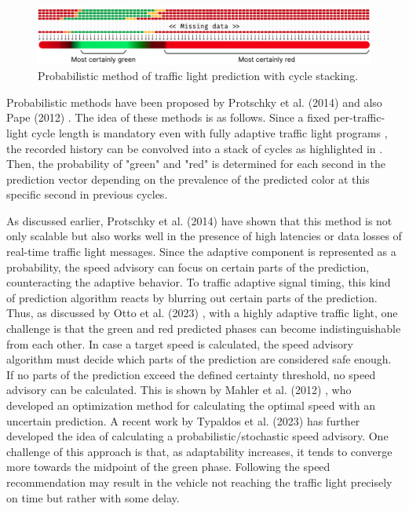 \begin{figure}[t]
\centering
\includegraphics[width=\linewidth]{images/prediction.pdf}
\caption{Probabilistic method of traffic light prediction with cycle stacking.}
\label{fig:prediction}
\end{figure}

Probabilistic methods have been proposed by Protschky et al. (2014) \cite{protschky_extensive_2014, protschky_adaptive_2014} and also Pape (2012) \cite{pape_untersuchung_2012}. The idea of these methods is as follows. Since a fixed per-traffic-light cycle length is mandatory even with fully adaptive traffic light programs \cite{protschky_extensive_2014}, the recorded history can be convolved into a stack of cycles as highlighted in . Then, the probability of "green" and "red" is determined for each second in the prediction vector depending on the prevalence of the predicted color at this specific second in previous cycles.

As discussed earlier, Protschky et al. (2014) \cite{protschky_extensive_2014, protschky_adaptive_2014} have shown that this method is not only scalable but also works well in the presence of high latencies or data losses of real-time traffic light messages. Since the adaptive component is represented as a probability, the speed advisory can focus on certain parts of the prediction, counteracting the adaptive behavior. To traffic adaptive signal timing, this kind of prediction algorithm reacts by blurring out certain parts of the prediction. Thus, as discussed by Otto et al. (2023) \cite{otto_framework_2023}, with a highly adaptive traffic light, one challenge is that the green and red predicted phases can become indistinguishable from each other. In case a target speed is calculated, the speed advisory algorithm must decide which parts of the prediction are considered safe enough. If no parts of the prediction exceed the defined certainty threshold, no speed advisory can be calculated. This is shown by Mahler et al. (2012) \cite{mahler_reducing_2012}, who developed an optimization method for calculating the optimal speed with an uncertain prediction. A recent work by Typaldos et al. (2023) \cite{typaldos_modified_2023} has further developed the idea of calculating a probabilistic/stochastic speed advisory. One challenge of this approach is that, as adaptability increases, it tends to converge more towards the midpoint of the green phase. Following the speed recommendation may result in the vehicle not reaching the traffic light precisely on time but rather with some delay.

